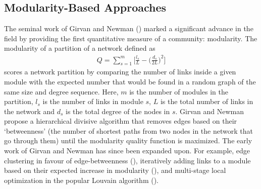 \documentclass[
11pt, %
english, %
singlespacing, %
headsepline, %
]{MastersDoctoralThesis} %
\begin{document}
\subsection{Modularity-Based Approaches}
The seminal work of Girvan and Newman (\cite{girvan2002community}) marked a significant advance in the field by providing the first quantitative measure of a community: modularity. 
The modularity of a partition of a network 
defined as
\begin{align} 
\label{modularity}
Q = \sum_{s=1}^m \bigg[ \frac{l_s}{L} - \bigg( \frac{d_s}{2L} \bigg)^2\bigg]
\end{align}
scores a network partition by comparing the number of links inside a given module with the expected number that would be found in a random graph of the same size and degree sequence. 
Here, $m$ is the number of modules in the partition, $l_s$ is the number of links in module $s$, $L$ is the total number of links in the network and $d_s$ is the total degree of the nodes in $s$. 
Girvan and Newman propose a hierarchical divisive algorithm that removes edges based on their `betweenness' (the number of shortest paths from two nodes in the network that go through them) until the modularity quality function is maximized. 
The early work of Girvan and Newman has since been expanded upon.
For example, edge clustering in favour of edge-betweenness (\cite{radicchi2004defining}), iteratively adding links to a module based on their expected increase in modularity (\cite{clauset2004finding}), and multi-stage local optimization in the popular Louvain algorithm (\cite{blondel2008fast}).

\end{document}
